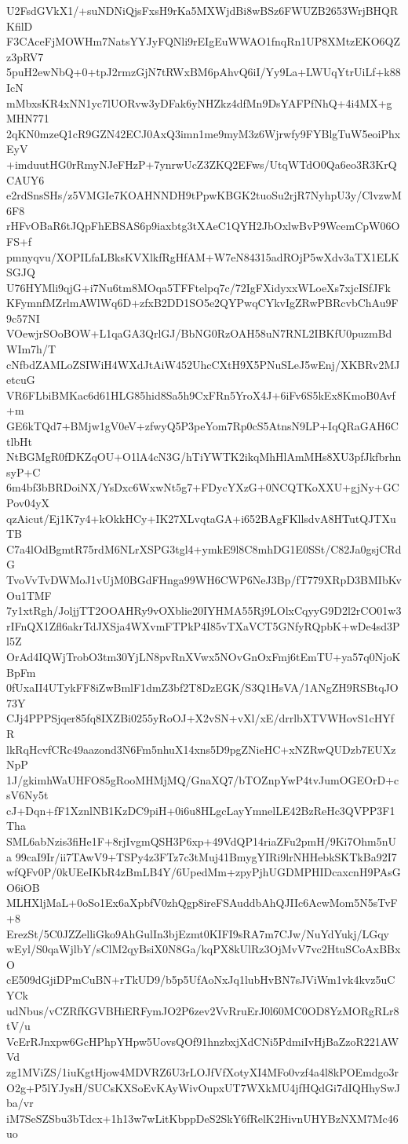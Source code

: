 U2FsdGVkX1/+suNDNiQjsFxsH9rKa5MXWjdBi8wBSz6FWUZB2653WrjBHQRKfilD
F3CAceFjMOWHm7NatsYYJyFQNli9rEIgEuWWAO1fnqRn1UP8XMtzEKO6QZz3pRV7
5puH2ewNbQ+0+tpJ2rmzGjN7tRWxBM6pAhvQ6iI/Yy9La+LWUqYtrUiLf+k88IcN
mMbxsKR4xNN1yc7lUORvw3yDFak6yNHZkz4dfMn9DsYAFPfNhQ+4i4MX+gMHN771
2qKN0mzeQ1cR9GZN42ECJ0AxQ3imn1me9myM3z6Wjrwfy9FYBlgTuW5eoiPhxEyV
+imduutHG0rRmyNJeFHzP+7ynrwUcZ3ZKQ2EFws/UtqWTdO0Qa6eo3R3KrQCAUY6
e2rdSnsSHs/z5VMGIe7KOAHNNDH9tPpwKBGK2tuoSu2rjR7NyhpU3y/ClvzwM6F8
rHFvOBaR6tJQpFhEBSAS6p9iaxbtg3tXAeC1QYH2JbOxlwBvP9WcemCpW06OFS+f
pmnyqvu/XOPILfaLBksKVXlkfRgHfAM+W7eN84315adROjP5wXdv3aTX1ELKSGJQ
U76HYMli9qjG+i7Nu6tm8MOqa5TFFtelpq7c/72IgFXidyxxWLoeXs7xjcISfJFk
KFymnfMZrlmAWlWq6D+zfxB2DD1SO5e2QYPwqCYkvIgZRwPBRcvbChAu9F9c57NI
VOewjrSOoBOW+L1qaGA3QrlGJ/BbNG0RzOAH58uN7RNL2IBKfU0puzmBdWIm7h/T
cNfbdZAMLoZSIWiH4WXdJtAiW452UhcCXtH9X5PNuSLeJ5wEnj/XKBRv2MJetcuG
VR6FLbiBMKac6d61HLG85hid8Sa5h9CxFRn5YroX4J+6iFv6S5kEx8KmoB0Avf+m
GE6kTQd7+BMjw1gV0eV+zfwyQ5P3peYom7Rp0cS5AtnsN9LP+IqQRaGAH6CtlbHt
NtBGMgR0fDKZqOU+O1lA4cN3G/hTiYWTK2ikqMhHlAmMHs8XU3pfJkfbrhnsyP+C
6m4bf3bBRDoiNX/YsDxc6WxwNt5g7+FDycYXzG+0NCQTKoXXU+gjNy+GCPov04yX
qzAicut/Ej1K7y4+kOkkHCy+IK27XLvqtaGA+i652BAgFKllsdvA8HTutQJTXuTB
C7a4lOdBgmtR75rdM6NLrXSPG3tgl4+ymkE9l8C8mhDG1E0SSt/C82Ja0gsjCRdG
TvoVvTvDWMoJ1vUjM0BGdFHnga99WH6CWP6NeJ3Bp/fT779XRpD3BMIbKvOu1TMF
7y1xtRgh/JoljjTT2OOAHRy9vOXblie20IYHMA55Rj9LOlxCqyyG9D2l2rCO01w3
rIFnQX1Zfl6akrTdJXSja4WXvmFTPkP4I85vTXaVCT5GNfyRQpbK+wDe4sd3Pl5Z
OrAd4IQWjTrobO3tm30YjLN8pvRnXVwx5NOvGnOxFmj6tEmTU+ya57q0NjoKBpFm
0fUxaII4UTykFF8iZwBmlF1dmZ3bf2T8DzEGK/S3Q1HsVA/1ANgZH9RSBtqJO73Y
CJj4PPPSjqer85fq8IXZBi0255yRoOJ+X2vSN+vXl/xE/drrlbXTVWHovS1cHYfR
lkRqHcvfCRc49aazond3N6Fm5nhuX14xns5D9pgZNieHC+xNZRwQUDzb7EUXzNpP
1J/gkimhWaUHFO85gRooMHMjMQ/GnaXQ7/bTOZnpYwP4tvJumOGEOrD+csV6Ny5t
cJ+Dqn+fF1XznlNB1KzDC9piH+0i6u8HLgcLayYmnelLE42BzReHc3QVPP3F1Tha
SML6abNzis3fiHe1F+8rjIvgmQSH3P6xp+49VdQP14riaZFu2pmH/9Ki7Ohm5nUa
99caI9Ir/ii7TAwV9+TSPy4z3FTz7c3tMuj41BmygYIRi9lrNHHebkSKTkBa92I7
wfQFv0P/0kUEeIKbR4zBmLB4Y/6UpedMm+zpyPjhUGDMPHIDcaxcnH9PAsGO6iOB
MLHXljMaL+0oSo1Ex6aXpbfV0zhQgp8ireFSAuddbAhQJIIc6AcwMom5N5sTvF+8
ErezSt/5C0JZZelliGko9AhGulIn3bjEzmt0KIFI9sRA7m7CJw/NuYdYukj/LGqy
wEyl/S0qaWjlbY/sClM2qyBsiX0N8Ga/kqPX8kUlRz3OjMvV7vc2HtuSCoAxBBxO
cE509dGjiDPmCuBN+rTkUD9/b5p5UfAoNxJq1lubHvBN7sJViWm1vk4kvz5uCYCk
udNbus/vCZRfKGVBHiERFymJO2P6zev2VvRruErJ0l60MC0OD8YzMORgRLr8tV/u
VcErRJnxpw6GcHPhpYHpw5UovsQOf91hnzbxjXdCNi5PdmiIvHjBaZzoR221AWVd
zg1MViZS/1iuKgtHjow4MDVRZ6U3rLOJfVfXotyXI4MFo0vzf4a4l8kPOEmdgo3r
O2g+P5lYJysH/SUCsKXSoEvKAyWivOupxUT7WXkMU4jfHQdGi7dIQHhySwJba/vr
iM7SeSZSbu3bTdcx+1h13w7wLitKbppDeS2SkY6fRelK2HivnUHYBzNXM7Mc46uo
